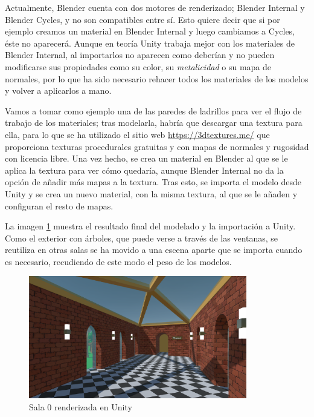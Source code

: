 Actualmente, Blender cuenta con dos motores de renderizado; Blender Internal y Blender Cycles, y no son compatibles entre sí. Esto quiere decir que si por ejemplo creamos un material en Blender Internal y luego cambiamos a Cycles, éste no aparecerá. Aunque en teoría Unity trabaja mejor con los materiales de Blender Internal, al importarlos no aparecen como deberían y no pueden modificarse sus propiedades como su color, su \textit{metalicidad} o su mapa de normales, por lo que ha sido necesario rehacer todos los materiales de los modelos y volver a aplicarlos a mano.

Vamos a tomar como ejemplo una de las paredes de ladrillos para ver el flujo de trabajo de los materiales; tras modelarla, habría que descargar una textura para ella, para lo que se ha utilizado el sitio web \url{https://3dtextures.me/} que proporciona texturas procedurales gratuitas y con mapas de normales y rugosidad con licencia libre. Una vez hecho, se crea un material en Blender al que se le aplica la textura para ver cómo quedaría, aunque Blender Internal no da la opción de añadir más mapas a la textura. Tras esto, se importa el modelo desde Unity y se crea un nuevo material, con la misma textura, al que se le añaden y configuran el resto de mapas.

La imagen \ref{fig:unity-sala-0} muestra el resultado final del modelado y la importación a Unity. Como el exterior con árboles, que puede verse a través de las ventanas, se reutiliza en otras salas se ha movido a una escena aparte que se importa cuando es necesario, recudiendo de este modo el peso de los modelos.

\begin{figure}[!h]
\begin{center}
\includegraphics[width=0.85\textwidth]{imagenes/7/salas-unity/unity-sala-0.png}
\caption{Sala 0 renderizada en Unity}
\label{fig:unity-sala-0}
\end{center}
\end{figure}

